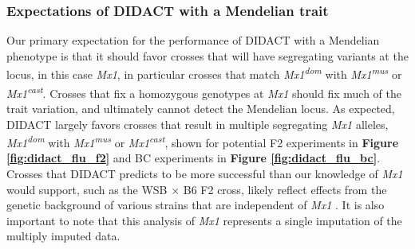 \subsubsection{Expectations of DIDACT with a Mendelian trait}

Our primary expectation for the performance of DIDACT with a Mendelian phenotype is that it should favor crosses that will have segregating variants at the locus, in this case \textit{Mx1}, in particular crosses that match \textit{Mx1}\textsuperscript{\textit{dom}} with \textit{Mx1}\textsuperscript{\textit{mus}} or \textit{Mx1}\textsuperscript{\textit{cast}}. Crosses that fix a homozygous genotypes at \textit{Mx1} should fix much of the trait variation, and ultimately cannot detect the Mendelian locus. As expected, DIDACT largely favors crosses that result in multiple segregating \textit{Mx1} alleles, \textit{Mx1}\textsuperscript{\textit{dom}} with \textit{Mx1}\textsuperscript{\textit{mus}} or \textit{Mx1}\textsuperscript{\textit{cast}}, shown for potential F2 experiments in \textbf{Figure \ref{fig:didact_flu_f2}} and BC experiments in \textbf{Figure \ref{fig:didact_flu_bc}}. Crosses that DIDACT predicts to be more successful than our knowledge of \textit{Mx1} would support, such as the WSB $\times$ B6 F2 cross, likely reflect effects from the genetic background of various strains that are independent of \textit{Mx1} \citep{Maurizio2017}. It is also important to note that this analysis of \textit{Mx1} represents a single imputation of the multiply imputed data. 

